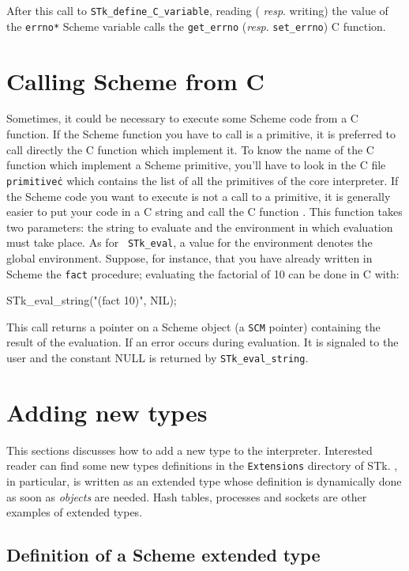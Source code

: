 \documentclass[10pt]{article}
\begin{document}
After this call to {\tt STk\_define\_C\_variable}, reading ({\em
resp}. writing) the value of the {\tt *errno*} Scheme variable calls the
{\tt get\_errno} ({\em resp}. {\tt set\_errno}) C function.

\section{Calling Scheme from C}

Sometimes, it could be necessary to execute some Scheme code from a C function.
If the Scheme function you have to call is a primitive, it is preferred to call
directly the C function which implement it. To know the name of the C function
which implement a Scheme primitive, you'll have to look in the C file {\tt
primitive\.c} which contains the list of all the primitives of the core
interpreter. If the Scheme code you want to execute is not a call to a
primitive, it is generally easier to put your code in a C string and call the C
function . This function takes two parameters: the string
to evaluate and the environment in which evaluation must take place. As for {\tt
STk\_eval}, a  value for the environment denotes the global
environment. Suppose, for instance, that you have already written in Scheme the
{\tt fact} procedure; evaluating the factorial of 10 can be done in C with:
\begin{Code}
\begin{listing}[200]{2}
STk_eval_string("(fact 10)", NIL);
\end{listing}
\end{Code}
This call returns a pointer on a Scheme object (a {\tt SCM} pointer) containing
the result of the evaluation. If an error occurs during evaluation. It is
signaled to the user and the constant NULL is returned by {\tt STk\_eval\_string}.

\section{Adding new types}

This sections discusses how to add a new type to the {\stk} interpreter. Interested
reader can find some new types definitions in the {\tt Extensions} directory of
STk. {\stklos}, in particular, is written as an extended type whose definition
is dynamically done as soon as {\em objects} are needed. Hash tables, processes
and sockets are other examples of extended types. 

\subsection{Definition of a Scheme extended type}
\end{document}
